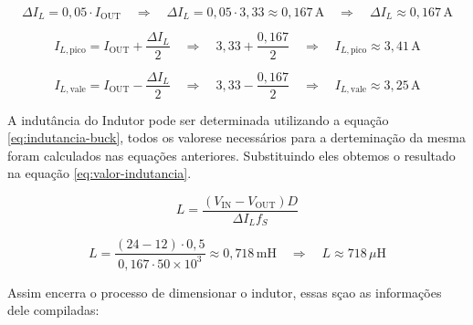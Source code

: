 \begin{equation}
    \Delta I_L = 0{,}05 \cdot I_{\mathrm{OUT}}
    \quad\Rightarrow\quad
    \Delta I_L = 0{,}05 \cdot 3{,}33
    \approx 0{,}167\,\mathrm{A}
    \quad\Rightarrow\quad
    \boxed{\Delta I_L \approx 0{,}167\,\mathrm{A}}
    \label{eq:ondulacao-corrente}
\end{equation}

\begin{equation}
    I_{L,\mathrm{pico}} =
    I_{\mathrm{OUT}} + \frac{\Delta I_L}{2}
    \quad\Rightarrow\quad
    3{,}33 + \frac{0{,}167}{2}
    \quad\Rightarrow\quad
    \boxed{I_{L,\mathrm{pico}}\approx 3{,}41\,\mathrm{A}}
    \label{eq:corrente-pico}
\end{equation}

\begin{equation}
    I_{L,\mathrm{vale}} =
    I_{\mathrm{OUT}} - \frac{\Delta I_L}{2}
    \quad\Rightarrow\quad
    3{,}33 - \frac{0{,}167}{2}
    \quad\Rightarrow\quad
    \boxed{I_{L,\mathrm{vale}}\approx 3{,}25\,\mathrm{A}}
    \label{eq:corrente-vale}
\end{equation}

A indutância do Indutor pode ser determinada utilizando a equação \ref{eq:indutancia-buck}, todos os valorese necessários para a derteminação da mesma foram calculados nas equações anteriores. Substituindo eles obtemos o resultado na equação \ref{eq:valor-indutancia}.


\begin{equation}
    L =
    \frac{(V_{\mathrm{IN}}-V_{\mathrm{OUT}})D}
    {\Delta I_L f_S}
    \label{eq:indutancia-buck}
\end{equation}

\begin{equation}
    L =
    \frac{(24-12)\cdot0{,}5}
    {0{,}167\cdot50\times10^3}
    \approx 0{,}718\,\mathrm{mH}
    \quad\Rightarrow\quad
    \boxed{L \approx 718\,\mu\mathrm{H}}
    \label{eq:valor-indutancia}
\end{equation}


Assim encerra o processo de dimensionar o indutor, essas sçao as informações dele compiladas:

